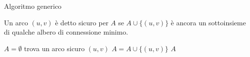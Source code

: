 \begin{frame}{Algoritmo generico}

\vspace{-9pt}
\begin{myboxtitle}
Un arco $(u,v)$ è detto \alert{sicuro per $A$} se $A \cup \{(u,v)\}$ è ancora un sottoinsieme di qualche albero di connessione minimo.
\end{myboxtitle}

\medskip
\begin{Procedure}
\caption[A]{\Set\ (\Graph $G$, $\INTEGER[\,]\ w$)}

  \Set $A = \emptyset$\;
  {
     trova un arco sicuro $(u,v)$\;
     $A = A \cup \{(u,v)\}$\;
  } 
  \Return $A$\;  

\end{Procedure}

\end{frame}


